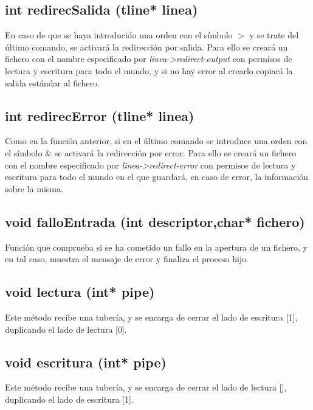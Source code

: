 \subsection{int redirecSalida (tline* linea)}
En caso de que se haya introducido una orden con el símbolo $>$ y se trate del último comando, se activará la redirección por salida. Para ello se creará un fichero con el nombre especificado por \textit{linea->redirect-output} con permisos de lectura y escritura para todo el mundo, y si no hay error al crearlo copiará la salida estándar al fichero.
\subsection{int redirecError (tline* linea)}
Como en la función anterior, si en el último comando se introduce una orden con el símbolo $\&$ se activará la redirección por error. Para ello se creará un fichero con el nombre especificado por \textit{linea->redirect-error} con permisos de lectura y escritura para todo el mundo en el que guardará, en caso de error, la información sobre la misma.
\subsection{void falloEntrada (int descriptor,char* fichero)}
Función que comprueba si se ha cometido un fallo en la apertura de un fichero, y en tal caso, muestra el mensaje de error y finaliza el proceso hijo.
\subsection{void lectura (int* pipe)}
Este método recibe una tubería, y se encarga de cerrar el lado de escritura [1], duplicando el lado de lectura [0].
\subsection{void escritura (int* pipe)}
Este método recibe una tubería, y se encarga de cerrar el lado de lectura [], duplicando el lado de escritura [1].
